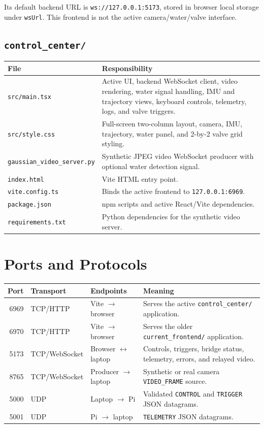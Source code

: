 \documentclass[11pt]{article}
\begin{document}
Its default backend URL is \texttt{ws://127.0.0.1:5173}, stored in browser
local storage under \texttt{wsUrl}. This frontend is not the active
camera/water/valve interface.

\subsection{\texttt{control\_center/}}

\begin{longtable}{p{}p{}}
\toprule
\textbf{File} & \textbf{Responsibility}\\
\midrule
\texttt{src/main.tsx} &
Active UI, backend WebSocket client, video rendering, water signal handling,
IMU and trajectory views, keyboard controls, telemetry, logs, and valve
triggers.\\
\texttt{src/style.css} &
Full-screen two-column layout, camera, IMU, trajectory, water panel, and
2-by-2 valve grid styling.\\
\texttt{gaussian\_video\_server.py} &
Synthetic JPEG video WebSocket producer with optional water detection signal.\\
\texttt{index.html} & Vite HTML entry point.\\
\texttt{vite.config.ts} & Binds the active frontend to \texttt{127.0.0.1:6969}.\\
\texttt{package.json} & npm scripts and active React/Vite dependencies.\\
\texttt{requirements.txt} & Python dependencies for the synthetic video server.\\
\bottomrule
\end{longtable}

\section{Ports and Protocols}

\begin{longtable}{rllp{}}
\toprule
\textbf{Port} & \textbf{Transport} & \textbf{Endpoints} & \textbf{Meaning}\\
\midrule
6969 & TCP/HTTP & Vite $\rightarrow$ browser &
Serves the active \texttt{control\_center/} application.\\
6970 & TCP/HTTP & Vite $\rightarrow$ browser &
Serves the older \texttt{current\_frontend/} application.\\
5173 & TCP/WebSocket & Browser $\leftrightarrow$ laptop &
Controls, triggers, bridge status, telemetry, errors, and relayed video.\\
8765 & TCP/WebSocket & Producer $\rightarrow$ laptop &
Synthetic or real camera \texttt{VIDEO\_FRAME} source.\\
5000 & UDP & Laptop $\rightarrow$ Pi &
Validated \texttt{CONTROL} and \texttt{TRIGGER} JSON datagrams.\\
5001 & UDP & Pi $\rightarrow$ laptop &
\texttt{TELEMETRY} JSON datagrams.\\
\bottomrule
\end{longtable}
\end{document}
